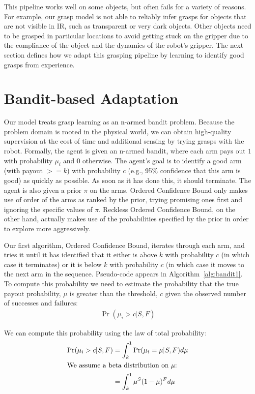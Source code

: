 \documentclass{article}
\newcommand{\algorithmCTxt}{Ordered Confidence Bound\xspace}
\newcommand{\algorithmDTxt}{Reckless Ordered Confidence Bound\xspace}
\begin{document}
This pipeline works well on some objects, but often fails for a
variety of reasons.  For example, our grasp model is not able to 
reliably infer grasps for objects that are not visible in IR, such as
transparent or very dark objects.  Other objects need to be
grasped in particular locations to avoid getting stuck on the gripper
due to the compliance of the object and the dynamics of the robot's
gripper.  The next section defines how we adapt this grasping pipeline
by learning to identify good grasps from experience.

\section{Bandit-based Adaptation}

Our model treats grasp learning as an n-armed bandit problem. Because
the problem domain is rooted in the physical world, we can obtain
high-quality supervision at the cost of time and additional sensing by
trying grasps with the robot. Formally, the agent is given an n-armed
bandit, where each arm pays out $1$ with probability $\mu_i$ and $0$
otherwise.  The agent's goal is to identify a good arm (with payout
$>= k$) with probability $c$ (e.g., 95\% confidence that this arm is
good) as quickly as possible.  As soon as it has done this, it should
terminate.  The agent is also given a prior $\pi$ on the
arms. \algorithmCTxt only makes use of order of the arms as ranked by
the prior, trying promising ones first and ignoring the specific
values of $\pi$. \algorithmDTxt, on the other hand, actually makes use
of the probabilities specified by the prior in order to explore more
aggressively.


Our first algorithm, \algorithmCTxt, iterates through each arm, and tries it
until it has identified that it either is above $k$ with probability
$c$ (in which case it terminates) or it is below $k$ with probability
$c$ (in which case it moves to the next arm in the sequence.
Pseudo-code appears in Algorithm~\ref{alg:bandit1}.  To compute this
probability we need to estimate the probability that the true payout
probability, $\mu$ is greater than the threshold, $c$ given the
observed number of successes and failures:
\begin{align}
\Pr(\mu_i > c|  S, F)
\end{align}

We can compute this probability using the law of total probability:
\begin{align}
\Pr(\mu_i > c|  S, F) &= \int_k^1 \Pr(\mu_i=\mu | S, F) d\mu\\
\intertext{We assume a beta distribution on $\mu$:}
                      &= \int_k^1 \mu^S (1- \mu) ^F d\mu
\end{align}
\end{document}
